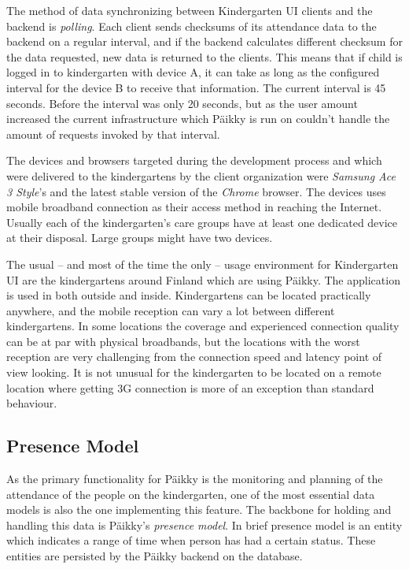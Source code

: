 The method of data synchronizing between Kindergarten UI clients and the backend is \textit{polling}. Each client sends checksums of its attendance data to the backend on a regular interval, and if the backend calculates different checksum for the data requested, new data is returned to the clients. This means that if child is logged in to kindergarten with device A, it can take as long as the configured interval for the device B to receive that information. The current interval is 45 seconds. Before the interval was only 20 seconds, but as the user amount increased the current infrastructure which Päikky is run on couldn't handle the amount of requests invoked by that interval. 

The devices and browsers targeted during the development process and which  were delivered to the kindergartens by the client organization were \textit{Samsung Ace 3 Style}'s and the latest stable version of the \textit{Chrome} browser. The devices uses mobile broadband connection as their access method in reaching the Internet. Usually each of the kindergarten's care groups have at least one dedicated device at their disposal. Large groups might have two devices. 

The usual – and most of the time the only – usage environment for Kindergarten UI are the kindergartens around Finland which are using Päikky. The application is used in both outside and inside. Kindergartens can be located practically anywhere, and the mobile reception can vary a lot between different kindergartens. In some locations the coverage and experienced connection quality can be at par with physical broadbands, but the locations with the worst reception are very challenging from the connection speed and latency point of view looking. It is not unusual for the kindergarten to be located on a remote location where getting 3G connection is more of an exception than standard behaviour. %


\subsection{Presence Model}


As the primary functionality for Päikky is the monitoring and planning of the attendance of the people on the kindergarten, one of the most essential data models is also the one implementing this feature. The backbone for holding and handling this data is Päikky's \textit{presence model}. In brief presence model is an entity which indicates a range of time when person has had a certain status. These entities are persisted by the Päikky backend on the database.

